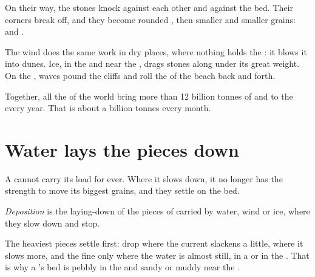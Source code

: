 On their way, the stones knock against each other and against the bed.
Their corners break off, and they become rounded , then smaller and
smaller grains:  and .

The wind does the same work in dry places, where nothing holds the :
it blows it into dunes. Ice, in the  and near the , drags
stones along under its great weight. On the , waves pound the cliffs
and roll the  of the beach back and forth.

\begin{remark}\label{rem:g5:water-shapes-the-land:how-much}
Together, all the  of the world bring more than 12 billion tonnes of
 and  to the  every year. That is about a billion tonnes every
month.
\end{remark}

\section{Water lays the pieces down}

A  cannot carry its load for ever. Where it slows down, it no longer
has the strength to move its biggest grains, and they settle on the bed.

\begin{definition}[Deposition]\label{def:g5:water-shapes-the-land:deposition}
\emph{Deposition} is the laying-down of the pieces of 
carried by water, wind or ice, where they slow down and stop.
\end{definition}

The heaviest pieces settle first:  drop where the current slackens a
little,  where it slows more, and the fine  only where the water is
almost still, in a  or in the . That is why a 's bed is pebbly
in the  and sandy or muddy near the .

